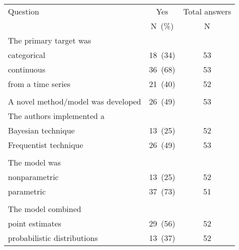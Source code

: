 \documentclass[preprint,authoryear]{elsarticle}
\begin{document}
\begin{table*}[ht!]
    \centering 
  \begin{tabular}{ L{5.5cm}cc }
    \hline
    Question                                                                    & Yes    & Total answers \\
                                                                                & N~(\%) & N \\
    \hline
    The primary target was\\
    \hspace{3mm}categorical                                                     &  18~(34)  & 53 \\ 
    \hspace{3mm}continuous                                                      &  36~(68)  & 53 \\
    \hspace{3mm}from a time series                                              &  21~(40)  & 52 \\
 \\
    A novel method/model was developed                                          & 26~(49)  & 53 \\   
    The authors implemented a\\
\hspace{3mm}Bayesian technique                                                  & 13~(25)  & 52 \\
    \hspace{3mm}Frequentist technique                                           & 26~(49)  & 53 \\ 
 \\   
    The model was\\
    \hspace{3mm}nonparametric                                                   & 13~(25) & 52 \\
    \hspace{3mm}parametric                                                      & 37~(73) & 51 \\
\\
    The model combined\\
    \hspace{3mm}point estimates                                                 & 29~(56) & 52 \\ 
    \hspace{3mm}probabilistic distributions                                     & 13~(37) & 52 \\

\end{tabular}
\end{table*}
\end{document}
